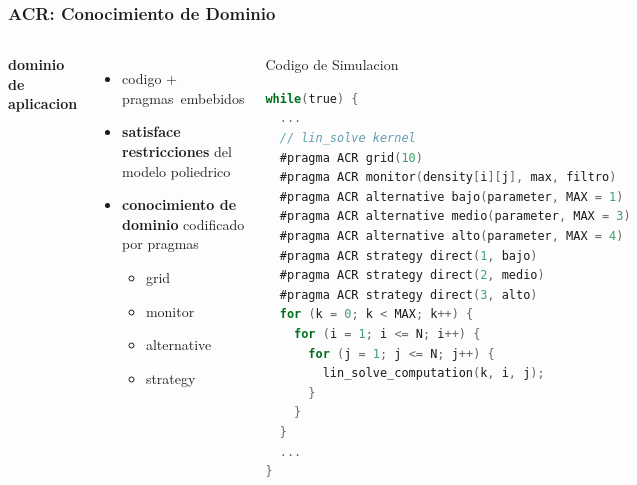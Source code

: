 \documentclass{beamer}\usetheme{Madrid} %
\begin{document}
\begin{frame}[fragile]
\frametitle{ACR: Conocimiento de Dominio}
\begin{columns}
\textbf{dominio de aplicacion}
\begin{itemize}
\item codigo + pragmas~embebidos
\item \textbf{satisface restricciones} del modelo poliedrico
\item \textbf{conocimiento de dominio} codificado por pragmas
\begin{itemize}
\item grid
\item monitor
\item alternative
\item strategy
\end{itemize}
\end{itemize}
\begin{block}{Codigo de Simulacion}
\begin{lstlisting}[basicstyle=\tiny,language=C]
while(true) {
  ...
  // lin_solve kernel
  #pragma ACR grid(10)
  #pragma ACR monitor(density[i][j], max, filtro)
  #pragma ACR alternative bajo(parameter, MAX = 1)
  #pragma ACR alternative medio(parameter, MAX = 3)
  #pragma ACR alternative alto(parameter, MAX = 4)
  #pragma ACR strategy direct(1, bajo)
  #pragma ACR strategy direct(2, medio)
  #pragma ACR strategy direct(3, alto)
  for (k = 0; k < MAX; k++) {
    for (i = 1; i <= N; i++) {
      for (j = 1; j <= N; j++) {
        lin_solve_computation(k, i, j);
      }
    }
  }
  ...
} 
\end{lstlisting}
\end{block}
\end{columns}
\end{frame}
\end{document}
